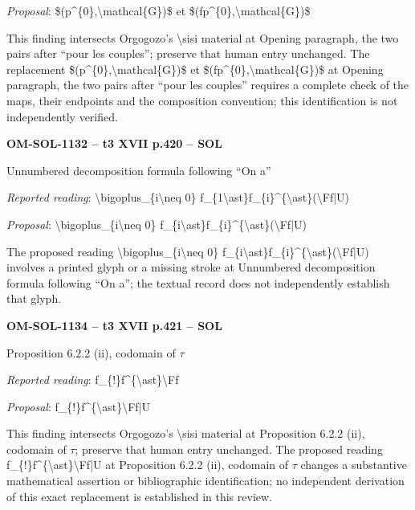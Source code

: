 \emph{Proposal}: \$(p\textasciicircum{}\{0\},\textbackslash{}mathcal\{G\})\$ et \$(fp\textasciicircum{}\{0\},\textbackslash{}mathcal\{G\})\$\par
This finding intersects Orgogozo's \textbackslash{}sisi material at Opening paragraph, the two pairs after “pour les couples”; preserve that human entry unchanged. The replacement \$(p\textasciicircum{}\{0\},\textbackslash{}mathcal\{G\})\$ et \$(fp\textasciicircum{}\{0\},\textbackslash{}mathcal\{G\})\$ at Opening paragraph, the two pairs after “pour les couples” requires a complete check of the maps, their endpoints and the composition convention; this identification is not independently verified.\par
\par\noindent\textbf{OM-SOL-1132 -- t3 XVII p.420 -- SOL}\par
Unnumbered decomposition formula following “On a”\par
\emph{Reported reading}: \textbackslash{}bigoplus\_\{i\textbackslash{}neq 0\} f\_\{1\textbackslash{}ast\}f\_\{i\}\textasciicircum{}\{\textbackslash{}ast\}(\textbackslash{}Ff|U)\par
\emph{Proposal}: \textbackslash{}bigoplus\_\{i\textbackslash{}neq 0\} f\_\{i\textbackslash{}ast\}f\_\{i\}\textasciicircum{}\{\textbackslash{}ast\}(\textbackslash{}Ff|U)\par
The proposed reading \textbackslash{}bigoplus\_\{i\textbackslash{}neq 0\} f\_\{i\textbackslash{}ast\}f\_\{i\}\textasciicircum{}\{\textbackslash{}ast\}(\textbackslash{}Ff|U) involves a printed glyph or a missing stroke at Unnumbered decomposition formula following “On a”; the textual record does not independently establish that glyph.\par
\par\noindent\textbf{OM-SOL-1134 -- t3 XVII p.421 -- SOL}\par
Proposition 6.2.2 (ii), codomain of \ensuremath{\tau}\par
\emph{Reported reading}: f\_\{!\}f\textasciicircum{}\{\textbackslash{}ast\}\textbackslash{}Ff\par
\emph{Proposal}: f\_\{!\}f\textasciicircum{}\{\textbackslash{}ast\}\textbackslash{}Ff|U\par
This finding intersects Orgogozo's \textbackslash{}sisi material at Proposition 6.2.2 (ii), codomain of \ensuremath{\tau}; preserve that human entry unchanged. The proposed reading f\_\{!\}f\textasciicircum{}\{\textbackslash{}ast\}\textbackslash{}Ff|U at Proposition 6.2.2 (ii), codomain of \ensuremath{\tau} changes a substantive mathematical assertion or bibliographic identification; no independent derivation of this exact replacement is established in this review.\par
